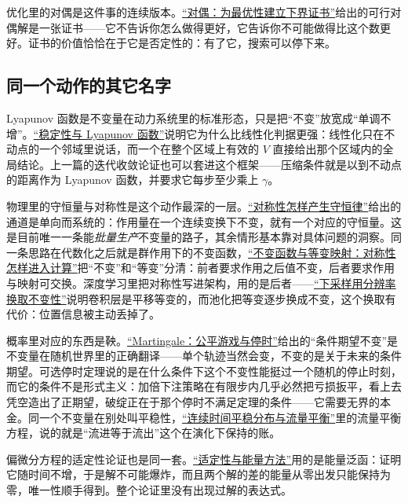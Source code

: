 优化里的对偶是这件事的连续版本。\hyperref[ch:075]{``对偶：为最优性建立下界证书''}给出的可行对偶解是一张证书——它不告诉你怎么做得更好，它告诉你不可能做得比这个数更好。证书的价值恰恰在于它是否定性的：有了它，搜索可以停下来。

\subsection{同一个动作的其它名字}

Lyapunov 函数是不变量在动力系统里的标准形态，只是把``不变''放宽成``单调不增''。\hyperref[sec:15-Differential-Equations-and-Dynamical-Systems/02-Stability-and-Dynamical-Systems/02]{``稳定性与 Lyapunov 函数''}说明它为什么比线性化判据更强：线性化只在不动点的一个邻域里说话，而一个在整个区域上有效的 \(V\) 直接给出那个区域内的全局结论。上一篇的迭代收敛论证也可以套进这个框架——压缩条件就是以到不动点的距离作为 Lyapunov 函数，并要求它每步至少乘上 \(\gamma\)。

物理里的守恒量与对称性是这个动作最深的一层。\hyperref[sec:12-Real-Analysis-Support/10-Essential-Structures/01]{``对称性怎样产生守恒律''}给出的通道是单向而系统的：作用量在一个连续变换下不变，就有一个对应的守恒量。这是目前唯一一条能\emph{批量生产}不变量的路子，其余情形基本靠对具体问题的洞察。同一条思路在代数化之后就是群作用下的不变函数，\hyperref[sec:04-Discrete-Mathematics/06-Groups-and-Symmetry/04]{``不变函数与等变映射：对称性怎样进入计算''}把``不变''和``等变''分清：前者要求作用之后值不变，后者要求作用与映射可交换。深度学习里把对称性写进架构，用的是后者——\hyperref[sec:14-Deep-Learning/04-Convolutional-Networks/03]{``下采样用分辨率换取不变性''}说明卷积层是平移等变的，而池化把等变逐步换成不变，这个换取有代价：位置信息被主动丢掉了。

概率里对应的东西是鞅。\hyperref[sec:06-Random-Processes/04-Applications/02]{``Martingale：公平游戏与停时''}给出的``条件期望不变''是不变量在随机世界里的正确翻译——单个轨迹当然会变，不变的是关于未来的条件期望。可选停时定理说的是在什么条件下这个不变性能挺过一个随机的停止时刻，而它的条件不是形式主义：加倍下注策略在有限步内几乎必然把亏损扳平，看上去凭空造出了正期望，破绽正在于那个停时不满足定理的条件——它需要无界的本金。同一个不变量在别处叫平稳性，\hyperref[sec:06-Random-Processes/05-Continuous-Time-Markov-Chains-and-Queues/03]{``连续时间平稳分布与流量平衡''}里的流量平衡方程，说的就是``流进等于流出''这个在演化下保持的账。

偏微分方程的适定性论证也是同一套。\hyperref[sec:15-Differential-Equations-and-Dynamical-Systems/03-PDE-Introduction/03]{``适定性与能量方法''}用的是能量泛函：证明它随时间不增，于是解不可能爆炸，而且两个解的差的能量从零出发只能保持为零，唯一性顺手得到。整个论证里没有出现过解的表达式。

